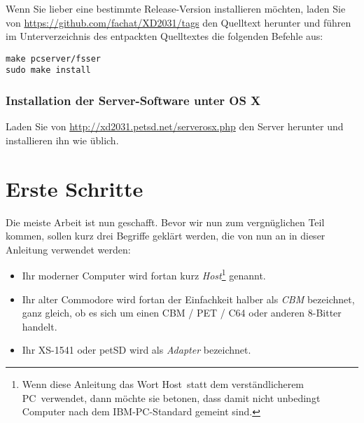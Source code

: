\documentclass[10pt,a4paper]{scrartcl}		%
\newcommand{\osxbinaries}{\url{http://xd2031.petsd.net/serverosx.php}}
\newcommand{\srcdownloads}{\url{https://github.com/fachat/XD2031/tags}}
\begin{document}
Wenn Sie lieber eine bestimmte Release-Version installieren möchten, 
laden Sie von \srcdownloads{} den Quelltext herunter und führen im 
Unterverzeichnis des entpackten Quelltextes die folgenden Befehle aus:

\begin{lstlisting}
make pcserver/fsser
sudo make install
\end{lstlisting}

\subsubsection{Installation der Server-Software unter OS X}
Laden Sie von \osxbinaries{} den Server herunter und installieren ihn 
wie üblich.

\section{Erste Schritte}
Die meiste Arbeit ist nun geschafft. Bevor wir nun zum vergnüglichen
Teil kommen, sollen kurz drei Begriffe geklärt werden, die von nun
an in dieser Anleitung verwendet werden:
\begin{itemize}
\item Ihr moderner Computer wird fortan kurz \textit{Host}\footnote
	{Wenn diese Anleitung das Wort \glqq Host\grqq\ statt dem 
	verständlicherem \glqq PC\grqq\ verwendet, dann möchte sie betonen, 
	dass damit nicht unbedingt Computer nach dem IBM-PC-Standard 
	gemeint sind.}
genannt.
\item Ihr alter Commodore wird fortan der Einfachkeit halber als 
\textit{CBM} bezeichnet, ganz gleich, ob es sich um einen CBM / PET / C64 
oder anderen 8-Bitter handelt.
\item Ihr XS-1541 oder petSD wird als \textit{Adapter} bezeichnet.
\end{itemize}
\end{document}
